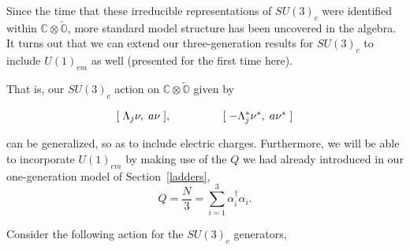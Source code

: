 \documentclass[letterpaper,12pt,titlepage,oneside,final]{book}
\newcommand{\COOO}{\mathbb{C}\otimes\overleftarrow{\mathbb{O}}}
\begin{document}



Since the time that these irreducible representations of $SU(3)_c$ were identified within $\COOO$, more standard model structure has been uncovered in the algebra.  It turns out that we can extend our three-generation results for $SU(3)_c$ to include $U(1)_{em}$ as well (presented for the first time here).  

That is, our $SU(3)_c$ action on $\COOO$ given by 

\begin{equation}\begin{array}{lll}\label{simpleaction}\large[\hspace{1mm}\Lambda_j \nu,\hspace{1mm} a \nu \hspace{1mm}\large], & \hspace{1cm}&\large[\hspace{1mm}-\Lambda_j^* \nu^*, \hspace{1mm}a \nu^* \hspace{1mm}\large] 
\end{array}\end{equation}

\noindent can be generalized, so as to include electric charges.  Furthermore, we will be able to incorporate $U(1)_{em}$ by making use of the $Q$ we had already introduced in our one-generation model of Section~\ref{ladders}, 
\begin{equation}Q=\frac{N}{3} = \sum_{i=1}^3 \alpha^{\dagger}_i\alpha_i.
\end{equation}

Consider the following action for the $SU(3)_c$ generators,
\end{document}
